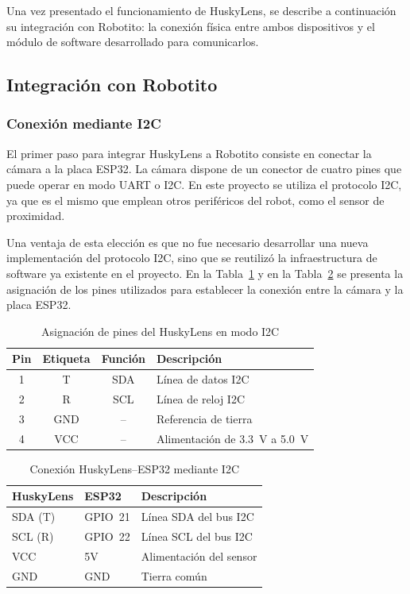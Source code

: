 \documentclass{prgrado}
\begin{document}
Una vez presentado el funcionamiento de HuskyLens, se describe a continuación su integración con Robotito: la conexión física entre ambos dispositivos y el módulo de software desarrollado para comunicarlos.

\subsection{Integración con Robotito}

\subsubsection{Conexión mediante I2C}

El primer paso para integrar HuskyLens a Robotito consiste en conectar la cámara a la placa ESP32. La cámara dispone de un conector de cuatro pines que puede operar en modo UART o I2C. En este proyecto se utiliza el protocolo I2C, ya que es el mismo que emplean otros periféricos del robot, como el sensor de proximidad.

Una ventaja de esta elección es que no fue necesario desarrollar una nueva implementación del protocolo I2C, sino que se reutilizó la infraestructura de software ya existente en el proyecto. En la Tabla~\ref{tab:huskylens_pines_i2c} y en la Tabla~\ref{tab:conexion_huskylens_esp32}  se presenta la asignación de los pines utilizados para establecer la conexión entre la cámara y la placa ESP32.

\begin{table}[H]
\centering
\caption{Asignación de pines del HuskyLens en modo I2C}
\label{tab:huskylens_pines_i2c}
\begin{tabular}{|c|c|c|l|}
\hline
\textbf{Pin} & \textbf{Etiqueta} & \textbf{Función} & \textbf{Descripción} \\ \hline
1 & T   & SDA & Línea de datos I2C \\ \hline
2 & R   & SCL & Línea de reloj I2C \\ \hline
3 & GND & --  & Referencia de tierra \\ \hline
4 & VCC & --  & Alimentación de 3.3~V a 5.0~V \\ \hline
\end{tabular}
\end{table}

\begin{table}[H]
\centering
\caption{Conexión HuskyLens--ESP32 mediante I2C}
\label{tab:conexion_huskylens_esp32}
\begin{tabular}{|l|l|l|}
\hline
\textbf{HuskyLens} & \textbf{ESP32} & \textbf{Descripción} \\ \hline
SDA (T)   & GPIO~21 & Línea SDA del bus I2C \\ \hline
SCL (R)   & GPIO~22 & Línea SCL del bus I2C \\ \hline
VCC       & 5V      & Alimentación del sensor \\ \hline
GND       & GND     & Tierra común \\ \hline
\end{tabular}
\end{table}
\end{document}
